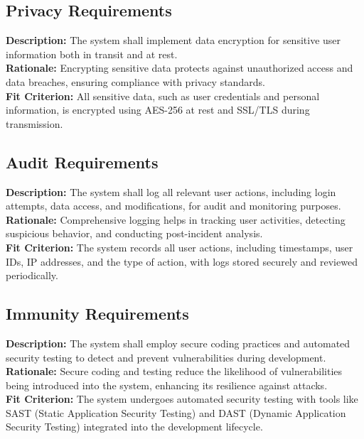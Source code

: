 \documentclass[12pt]{article}
\begin{document}
\subsection{Privacy Requirements}
\begin{tcolorbox}[title=SEC-PRI1]
\textbf{Description:} The system shall implement data encryption for sensitive user information both in transit and at rest. \\
\textbf{Rationale:} Encrypting sensitive data protects against unauthorized access and data breaches, ensuring compliance with privacy standards. \\
\textbf{Fit Criterion:} All sensitive data, such as user credentials and personal information, is encrypted using AES-256 at rest and SSL/TLS during transmission.
\end{tcolorbox}



\subsection{Audit Requirements}
\begin{tcolorbox}[title=SEC-AUD1]
\textbf{Description:} The system shall log all relevant user actions, including login attempts, data access, and modifications, for audit and monitoring purposes. \\
\textbf{Rationale:} Comprehensive logging helps in tracking user activities, detecting suspicious behavior, and conducting post-incident analysis. \\
\textbf{Fit Criterion:} The system records all user actions, including timestamps, user IDs, IP addresses, and the type of action, with logs stored securely and reviewed periodically.
\end{tcolorbox}



\subsection{Immunity Requirements}
\begin{tcolorbox}[title=SEC-IMM1]
\textbf{Description:} The system shall employ secure coding practices and automated security testing to detect and prevent vulnerabilities during development. \\
\textbf{Rationale:} Secure coding and testing reduce the likelihood of vulnerabilities being introduced into the system, enhancing its resilience against attacks. \\
\textbf{Fit Criterion:} The system undergoes automated security testing with tools like SAST (Static Application Security Testing) and DAST (Dynamic Application Security Testing) integrated into the development lifecycle.
\end{tcolorbox}
\end{document}
